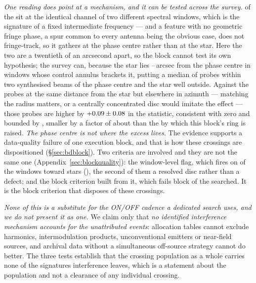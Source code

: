 \emph{One reading does point at a mechanism, and it can be tested across the
survey.} \DqBlockIfMult{} of the \DqBlockNCross{} sit at the identical
channel of two different spectral windows, which is the signature of a fixed
intermediate frequency --- and a feature with no geometric fringe phase, a
spur common to every antenna being the obvious case, does not fringe-track,
so it gathers at the phase centre rather than at the star. Here the two are a
twentieth of an arcsecond apart, so the block cannot test its own hypothesis;
the survey can, because the star lies \EvPcOffLo--\EvPcOffHi\,arcsec from the
phase centre in \EvPcNWin{} windows whose control annulus brackets it,
putting a median of \EvPcNNear{} probes within two synthesised beams of the
phase centre and the star well outside. Against the probes at the same
distance from the star but elsewhere in azimuth --- matching the radius
matters, or a centrally concentrated disc would imitate the effect --- those
probes are higher by $+0.09\pm0.08$ in the statistic, consistent with
zero and bounded by \EvPcBound, smaller by a factor of about \EvPcFactor{}
than the \EvPcNeed{} by which this block's ring is raised. \emph{The phase
centre is not where the excess lives.}
The evidence supports a
data-quality failure of one execution block, and that is how these
\EvNCrossFlag{} crossings are dispositioned (\S\ref{sec:bdblock}). Two
criteria are involved and they are not the same one
(Appendix~\ref{sec:blockquality}): the window-level flag, which fires on
\DqNWin{} of the \NWindows{} windows toward \DqNStar{} stars (\DqStars),
the second of them a resolved disc rather than a defect; and the block
criterion built from it, which fails \BqNFail{} block of the \BqNBlocks{}
searched. It is the block criterion that disposes of these crossings.

\emph{None of this is a substitute for the ON/OFF cadence a dedicated search
uses, and we do not present it as one.} We claim only that \emph{no
identified interference mechanism accounts for the unattributed events}:
allocation tables cannot exclude harmonics, intermodulation products,
unconventional emitters or near-field sources, and archival data without a
simultaneous off-source strategy cannot do better. The three tests establish
that the crossing population as a whole carries none of the signatures
interference leaves, which is a statement about the population and not a
clearance of any individual crossing.

